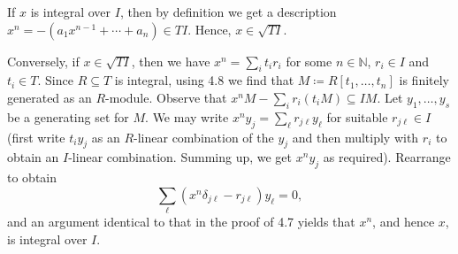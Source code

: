 If $x$ is integral over $I$, then by definition we get a description
$x^n = -(a_1x^{n-1} + \cdots + a_n) \in TI$. Hence, $x \in \sqrt{TI}$.

Conversely, if $x \in \sqrt{TI}$, then we have $x^n = \sum_i t_ir_i$ for some
$n \in \mathbb{N}$, $r_i \in I$ and $t_i \in T$. Since $R \subseteq T$ is
integral, using 4.8 we find that $M \coloneqq R[t_1, \ldots, t_n]$ is finitely generated
as an $R$-module. Observe that $x^nM - \sum_i r_i(t_iM) \subseteq IM$.
Let $y_1, \ldots, y_s$ be a generating set for $M$. We may write
$x^ny_j = \sum_\ell r_{j\ell}y_\ell$ for suitable $r_{j\ell} \in I$ (first write
$t_iy_j$ as an $R$-linear combination of the $y_j$ and then multiply with
$r_i$ to obtain an $I$-linear combination. Summing up, we get $x^ny_j$ as required).
Rearrange to obtain
\[ \sum_\ell (x^n\delta_{j\ell} - r_{j\ell})y_\ell = 0, \]
and an argument identical to that in the proof of 4.7 yields that $x^n$, and
hence $x$, is integral over $I$.
